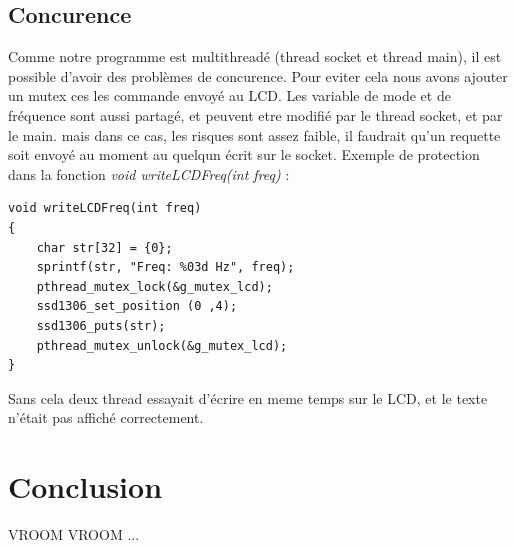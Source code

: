 \documentclass[
	a4paper, %
	10pt, %
]{CSUniSchoolLabReport}
\begin{document}
\subsection{Concurence}
Comme notre programme est multithreadé (thread socket et thread main), il est possible d'avoir des problèmes de concurence. Pour eviter cela nous avons ajouter un mutex ces les commande envoyé au LCD.
Les variable de mode et de fréquence sont aussi partagé, et peuvent etre modifié par le thread socket, et par le main. mais dans ce cas, les risques sont assez faible, il faudrait qu'un requette soit envoyé au moment au quelqun écrit sur le socket.
Exemple de protection dans la fonction \textit{void writeLCDFreq(int freq)} : \\
\begin{lstlisting}[style=CStyle]
void writeLCDFreq(int freq)
{
    char str[32] = {0};
    sprintf(str, "Freq: %03d Hz", freq);
    pthread_mutex_lock(&g_mutex_lcd);
    ssd1306_set_position (0 ,4);
    ssd1306_puts(str);
    pthread_mutex_unlock(&g_mutex_lcd);
}
\end{lstlisting}
Sans cela deux thread essayait d'écrire en meme temps sur le LCD, et le texte n'était pas affiché correctement.

\section{Conclusion}

VROOM VROOM ...



\printbibliography %

\end{document}

